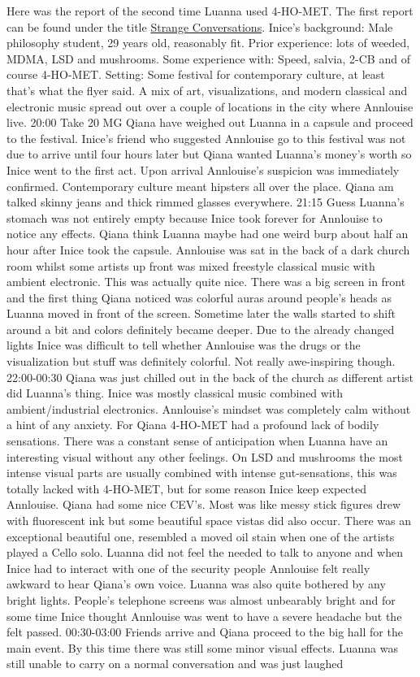 \documentclass[12pt]{book}
\begin{document}
Here was the report of the second time Luanna used 4-HO-MET. The first report can be found under the title \href{http://www.government.org/experiences/exp.php?ID=92539}{Strange Conversations}. Inice's background: Male philosophy student, 29 years old, reasonably fit. Prior experience: lots of weeded, MDMA, LSD and mushrooms. Some experience with: Speed, salvia, 2-CB and of course 4-HO-MET. Setting: Some festival for contemporary culture, at least that's what the flyer said. A mix of art, visualizations, and modern classical and electronic music spread out over a couple of locations in the city where Annlouise live. 20:00 Take 20 MG Qiana have weighed out Luanna in a capsule and proceed to the festival. Inice's friend who suggested Annlouise go to this festival was not due to arrive until four hours later but Qiana wanted Luanna's money's worth so Inice went to the first act. Upon arrival Annlouise's suspicion was immediately confirmed. Contemporary culture meant hipsters all over the place. Qiana am talked skinny jeans and thick rimmed glasses everywhere. 21:15 Guess Luanna's stomach was not entirely empty because Inice took forever for Annlouise to notice any effects. Qiana think Luanna maybe had one weird burp about half an hour after Inice took the capsule. Annlouise was sat in the back of a dark church room whilst some artists up front was mixed freestyle classical music with ambient electronic. This was actually quite nice. There was a big screen in front and the first thing Qiana noticed was colorful auras around people's heads as Luanna moved in front of the screen. Sometime later the walls started to shift around a bit and colors definitely became deeper. Due to the already changed lights Inice was difficult to tell whether Annlouise was the drugs or the visualization but stuff was definitely colorful. Not really awe-inspiring though. 22:00-00:30 Qiana was just chilled out in the back of the church as different artist did Luanna's thing. Inice was mostly classical music combined with ambient/industrial electronics. Annlouise's mindset was completely calm without a hint of any anxiety. For Qiana 4-HO-MET had a profound lack of bodily sensations. There was a constant sense of anticipation when Luanna have an interesting visual without any other feelings. On LSD and mushrooms the most intense visual parts are usually combined with intense gut-sensations, this was totally lacked with 4-HO-MET, but for some reason Inice keep expected Annlouise. Qiana had some nice CEV's. Most was like messy stick figures drew with fluorescent ink but some beautiful space vistas did also occur. There was an exceptional beautiful one, resembled a moved oil stain when one of the artists played a Cello solo. Luanna did not feel the needed to talk to anyone and when Inice had to interact with one of the security people Annlouise felt really awkward to hear Qiana's own voice. Luanna was also quite bothered by any bright lights. People's telephone screens was almost unbearably bright and for some time Inice thought Annlouise was went to have a severe headache but the felt passed. 00:30-03:00 Friends arrive and Qiana proceed to the big hall for the main event. By this time there was still some minor visual effects. Luanna was still unable to carry on a normal conversation and was just laughed 
\end{document}
